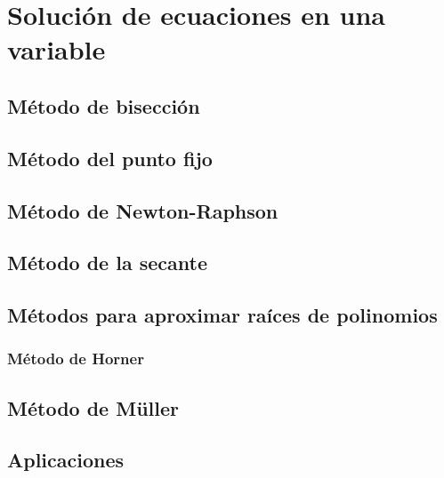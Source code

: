 \chapter{Solución de ecuaciones en una variable}

\section{Método de bisección}

\section{Método del punto fijo}

\section{Método de Newton-Raphson}

\section{Método de la secante}

\section{Métodos para aproximar raíces de polinomios}

\subsection{Método de Horner}

\section{Método de Müller}

\section{Aplicaciones}
